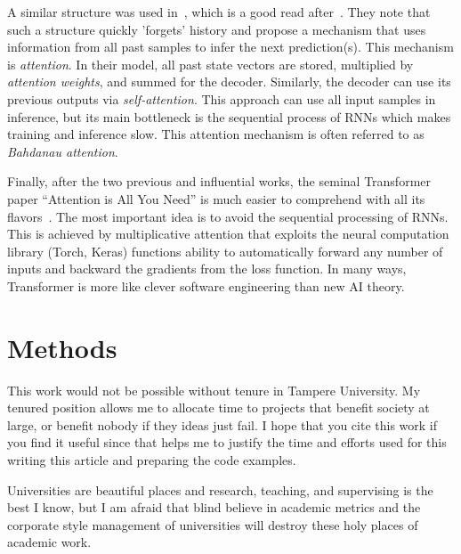 \documentclass[final]{article}
\begin{document}
A similar structure was used in~\cite{Cho-2014-emnlp}, which is a good
read after~\cite{Sutskever-2014-neurips}. They note that such a
structure quickly 'forgets' history and propose a mechanism that uses
information from all past samples to infer the next prediction(s).
This mechanism is \textit{attention}. In their model,  all past state
vectors are stored, multiplied by \textit{attention weights}, and
summed for the decoder. Similarly, the decoder can use its previous
outputs via \textit{self-attention}. This approach can use all input samples in
inference, but its main bottleneck is the sequential process of RNNs
which makes training and inference slow. This attention mechanism is
often referred to as \textit{Bahdanau attention}.

Finally, after the two previous and influential works, the seminal
Transformer paper ``Attention is All You Need'' is much easier to
comprehend with all its flavors~\cite{transformer}. The most important
idea is to avoid the sequential processing of RNNs. This is achieved
by multiplicative attention that exploits the neural computation
library (Torch, Keras) functions ability to automatically forward any
number of inputs and backward the gradients from the loss function. In
many ways, Transformer is more like clever software engineering than
new AI theory.


\section{Methods}


\begin{ack}
This work would not be possible without tenure in Tampere
University. My tenured position allows me to allocate time to projects
that benefit society at large, or benefit nobody if they ideas just
fail. I hope that you cite this work if you find it useful since that
helps me to justify the time and efforts used for this writing this
article and preparing the code examples.

Universities are beautiful
places and research, teaching, and supervising is the best I know, but
I am afraid that blind believe in academic metrics and the corporate
style management of universities will destroy these holy places of
academic work.
\end{ack}

\printbibliography
\end{document}
